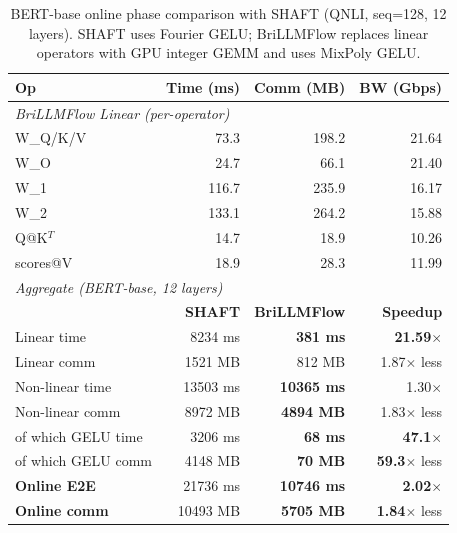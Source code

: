 \begin{table}[t]
\centering
\caption{BERT-base online phase comparison with SHAFT (QNLI, seq=128, 12 layers). SHAFT uses Fourier GELU; BriLLMFlow replaces linear operators with GPU integer GEMM and uses MixPoly GELU.}
\label{tab:bert_shaft_comparison}
\setlength{\tabcolsep}{4pt}
\footnotesize
\begin{tabular}{lrrr}
\toprule
\textbf{Op} & \textbf{Time (ms)} & \textbf{Comm (MB)} & \textbf{BW (Gbps)} \\
\midrule
\multicolumn{4}{l}{\textit{BriLLMFlow Linear (per-operator)}} \\
W\_Q/K/V    & 73.3 & 198.2 & 21.64 \\
W\_O        & 24.7 & 66.1 & 21.40 \\
W\_1        & 116.7 & 235.9 & 16.17 \\
W\_2        & 133.1 & 264.2 & 15.88 \\
Q@K$^T$     & 14.7 & 18.9 & 10.26 \\
scores@V    & 18.9 & 28.3 & 11.99 \\
\midrule
\multicolumn{4}{l}{\textit{Aggregate (BERT-base, 12 layers)}} \\
                       & \textbf{SHAFT} & \textbf{BriLLMFlow} & \textbf{Speedup} \\
Linear time            & 8234 ms & \textbf{381 ms} & \textbf{21.59}$\times$ \\
Linear comm            & 1521 MB & 812 MB & 1.87$\times$ less \\
Non-linear time        & 13503 ms & \textbf{10365 ms} & 1.30$\times$ \\
Non-linear comm        & 8972 MB & \textbf{4894 MB} & 1.83$\times$ less \\
\quad of which GELU time & 3206 ms & \textbf{68 ms} & \textbf{47.1}$\times$ \\
\quad of which GELU comm & 4148 MB & \textbf{70 MB} & \textbf{59.3}$\times$ less \\
\midrule
\textbf{Online E2E}    & 21736 ms & \textbf{10746 ms} & \textbf{2.02}$\times$ \\
\textbf{Online comm}   & 10493 MB & \textbf{5705 MB} & \textbf{1.84}$\times$ less \\
\bottomrule
\end{tabular}
\end{table}
